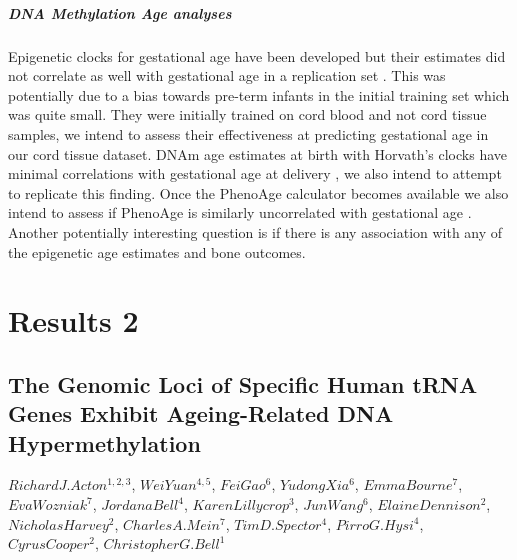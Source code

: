 \documentclass[]{book}
\begin{document}
\hypertarget{dna-methylation-age-analyses}{%
\subsubsection{DNA Methylation Age analyses}\label{dna-methylation-age-analyses}}

Epigenetic clocks for gestational age have been developed \citep[\citet{Knight2016}]{Bohlin2016} but their estimates did not correlate as well with gestational age in a replication set \citep{Simpkin2017a}. This was potentially due to a bias towards pre-term infants in the initial training set which was quite small. They were initially trained on cord blood and not cord tissue samples, we intend to assess their effectiveness at predicting gestational age in our cord tissue dataset. DNAm age estimates at birth with Horvath's clocks have minimal correlations with gestational age at delivery \citep[\citet{Simpkin2017}]{Simpkin2016}, we also intend to attempt to replicate this finding. Once the PhenoAge calculator becomes available we also intend to assess if PhenoAge is similarly uncorrelated with gestational age \citep{Levine2018}. Another potentially interesting question is if there is any association with any of the epigenetic age estimates and bone outcomes.

\hypertarget{part-results-2}{%
\part{Results 2}\label{part-results-2}}

\hypertarget{tRNApaper}{%
\chapter{The Genomic Loci of Specific Human tRNA Genes Exhibit Ageing-Related DNA Hypermethylation}\label{tRNApaper}}

\(Richard J. Acton ^{1,2,3}\), \(Wei Yuan ^{4,5}\), \(Fei Gao ^{6}\), \(Yudong Xia ^{6}\), \(Emma Bourne ^{7}\), \(Eva Wozniak ^{7}\), \(Jordana Bell ^{4}\), \(Karen Lillycrop ^{3}\), \(Jun Wang ^{6}\), \(Elaine Dennison ^{2}\), \(Nicholas Harvey ^{2}\), \(Charles A. Mein ^{7}\), \(Tim D. Spector ^{4}\), \(Pirro G. Hysi ^{4}\), \(Cyrus Cooper ^{2}\), \(Christopher G. Bell ^{1}\)
\end{document}

